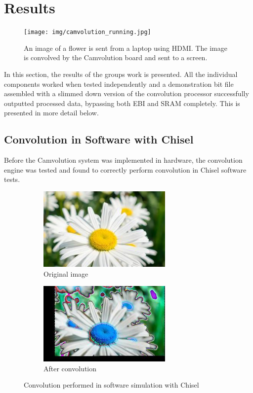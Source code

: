 \section{Results}
\begin{figure}[h]
    \centering
    \texttt{[image: img/camvolution\_running.jpg]}
    \caption[The implemented system running]{
        An image of a flower is sent from a laptop using HDMI.
        The image is convolved by the Camvolution board and sent to a screen.
    }
    \label{fig:systemRunning}
\end{figure}

In this section, the results of the groups work is presented.
All the individual components worked when tested independently and a demonstration bit file assembled with a slimmed down version of the convolution processor successfully outputted processed data, bypassing both EBI and SRAM completely.
This is presented in more detail below.

\subsection{Convolution in Software with Chisel}
Before the Camvolution system was implemented in hardware,
the convolution engine was tested and found to correctly perform convolution in Chisel software tests.

\begin{figure}[h]
    \centering
    \begin{subfigure}{7cm}
        \centering
        \includegraphics[width=6.5cm]{img/daisysmallorig.jpg}
        \caption{Original image}
    \end{subfigure}
    \begin{subfigure}{7cm}
        \centering
        \includegraphics[width=6.5cm]{img/daisysmall.jpg}
        \caption{After convolution}
    \end{subfigure}
    \caption[Software simulated convolution]{
        Convolution performed in software simulation with Chisel
    }
    \label{fig:soft_sim}
\end{figure}

